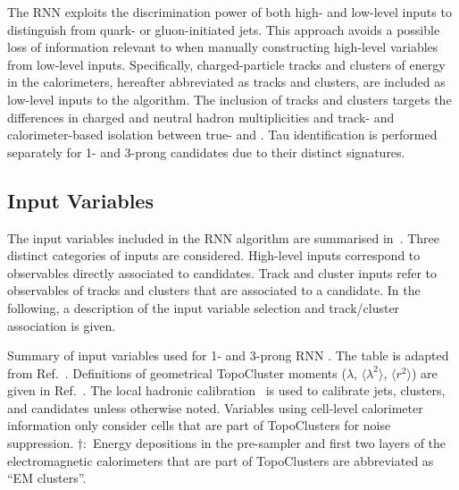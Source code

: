 The RNN \tauid exploits the discrimination power of both high- and
low-level inputs to distinguish \tauhad from quark- or gluon-initiated
jets. This approach avoids a possible loss of information relevant to
\tauid when manually constructing high-level variables from low-level
inputs. Specifically, charged-particle tracks and clusters of energy
in the calorimeters, hereafter abbreviated as tracks and clusters, are
included as low-level inputs to the algorithm. The inclusion of tracks
and clusters targets the differences in charged and neutral hadron
multiplicities and track- and calorimeter-based isolation between
true- and \faketauhadvis. Tau identification is performed separately
for 1- and 3-prong \tauhadvis candidates due to their distinct
signatures.


\subsection{Input Variables}

The input variables included in the RNN \tauid algorithm are
summarised in~. Three distinct
categories of inputs are considered. High-level inputs correspond to
observables directly associated to \tauhadvis candidates. Track and
cluster inputs refer to observables of tracks and clusters that are
associated to a \tauhadvis candidate. In the following, a description
of the input variable selection and track/cluster association is
given.

\begin{table}[htbp]
  \centering

  \caption{Summary of input variables used for 1- and 3-prong RNN
    \tauid. The table is adapted from
    Ref.~\cite{ATL-PHYS-PUB-2019-033}. Definitions of geometrical
    TopoCluster moments ($\lambda$, $\langle \lambda^2 \rangle$,
    $\langle r^2 \rangle$) are given in Ref.~\cite{PERF-2014-07}. The
    local hadronic calibration~\cite{PERF-2014-07} is used to
    calibrate jets, clusters, and \tauhadvis candidates unless
    otherwise noted. Variables using cell-level calorimeter
    information only consider cells that are part of TopoClusters for
    noise suppression. $\dagger$:~Energy depositions in the
    pre-sampler and first two layers of the electromagnetic
    calorimeters that are part of TopoClusters are abbreviated as ``EM
    clusters''.}%
  \label{tab:tauid_input_variables}

  \resizebox{0.99\textwidth}{!}{
    
  }
\end{table}

